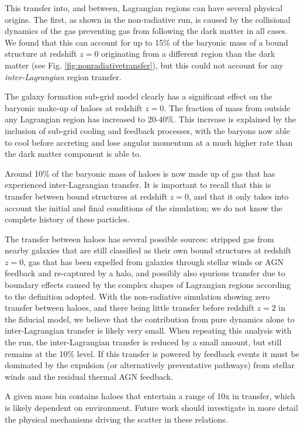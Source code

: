 This transfer into, and between, Lagrangian regions can have several physical
origins. The first, as shown in the non-radiative run, is caused by the
collisional dynamics of the gas preventing gas from following the dark matter
in all cases. We found that this can account for up to 15\% of the baryonic
mass of a bound structure at redshift $z=0$ originating from a different
region than the dark matter (see Fig. \ref{fig:nonradiativetransfer}), but this
could not account for any \emph{inter-Lagrangian} region transfer.

The galaxy formation sub-grid model clearly has a significant effect on the
baryonic make-up of haloes at redshift $z=0$. The fraction of mass from
outside any Lagrangian region has increased to 20-40\%. This increase is
explained by the inclusion of sub-grid cooling and feedback processes, with
the baryons now able to cool before accreting and lose angular momentum at a
much higher rate than the dark matter component is able to.

Around 10\% of the baryonic mass of haloes is now made up of gas that has
experienced inter-Lagrangian transfer. It is important to recall that this is transfer
between bound structures at redshift $z=0$, and that it only takes into account
the initial and final conditions of the simulation; we do not know the complete history
of these particles.

The transfer between haloes has several possible sources: stripped gas from
nearby galaxies that are still classified as their own bound structures at
redshift $z=0$, gas that has been expelled from galaxies through stellar
winds or AGN feedback and re-captured by a halo, and possibly also spurious
transfer due to boundary effects caused by the complex shapes of Lagrangian
regions according to the definition adopted. With the non-radiative
simulation showing zero transfer between haloes, and there being little
transfer before redshift $z=2$ in the fiducial model, we believe that the
contribution from pure dynamics alone to inter-Lagrangian transfer is likely
very small. When repeating this analysis with the \nojet{} run, the
inter-Lagrangian transfer is reduced by a small amount, but still remains at
the 10\% level. If this transfer is powered by feedback events it must be
dominated by the expulsion (or alternatively preventative pathways) from
stellar winds and the residual thermal AGN feedback.

A given mass bin contains haloes that entertain a range of 10x in transfer,
which is likely dependent on environment. Future work should investigate in more detail
the physical mechanisms driving the scatter in these relations.

